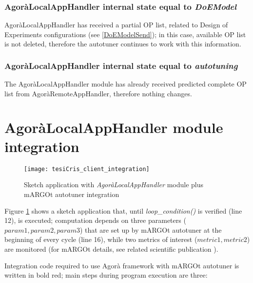 \subsubsection{AgoràLocalAppHandler internal state equal to \textit{DoEModel}}

AgoràLocalAppHandler has received a partial OP list, related to Design of Experiments configurations (see \ref{DoEModelSend}); in this case, available OP list is not deleted, therefore the autotuner continues to work with this information.


\subsubsection{AgoràLocalAppHandler internal state equal to \textit{autotuning}}

The AgoràLocalAppHandler module has already received predicted complete OP list from AgoràRemoteAppHandler, therefore nothing changes.





\section{AgoràLocalAppHandler module integration}

\begin{figure}[H]

    \centering
    \texttt{[image: tesiCris\_client\_integration]}
    \caption{Sketch application with \textit{AgoràLocalAppHandler} module plus mARGOt autotuner integration}
    \label{fig::sketchApp}
    
\end{figure}

Figure \ref{fig::sketchApp} shows a sketch application that, until \textit{loop\_con\-di\-tion()} is verified (line 12), is executed; computation depends on three parameters ($param1, param2, param3$) that are set up by mARGOt autotuner at the beginning of every cycle (line 16), while two metrics of interest ($metric1, metric2$) are monitored (for mARGOt details, see related scientific publication \cite{gadioli2015application}).

Integration code required to use Agorà framework with mARGOt autotuner is written in bold red; main steps during program execution are three:

